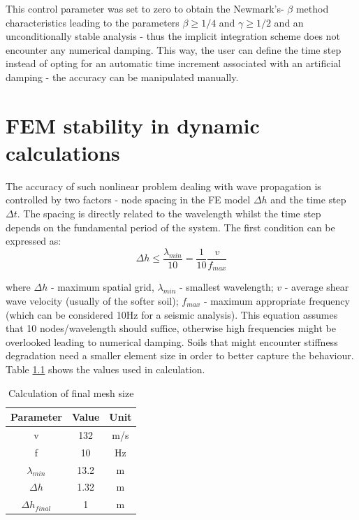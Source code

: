 \documentclass[12pt,a4paper]{report}
\begin{document}
This control parameter was set to zero to obtain the Newmark's- $\beta$ method characteristics leading to the parameters $\beta≥1/4$ and $\gamma ≥1/2$ and an unconditionally stable analysis - thus the implicit integration scheme does not encounter any numerical damping. This way, the user can define the time step instead of opting for an automatic time increment associated with an artificial damping - the accuracy can be manipulated manually.

\newpage
\chapter{FEM stability in dynamic calculations} \label{App:AppendixI}
The accuracy of such nonlinear problem dealing with wave propagation is controlled by two factors - node spacing in the FE model $\Delta h$ and the time step $\Delta t$. The spacing is directly related to the wavelength whilst the time step depends on the fundamental period of the system. 
The first condition can be expressed as:
\begin{equation}
\Delta h\leq\frac{\lambda_{min}}{10}=\frac{1}{10} \frac{v}{f_{max}}
\end{equation}

where $\Delta h$ - maximum spatial grid, $\lambda_{min}$ - smallest wavelength; $v$ - average shear wave velocity (usually of the softer soil); $f_{max}$ - maximum appropriate frequency (which can be considered 10Hz for a seismic analysis). This equation assumes that 10 nodes/wavelength should suffice, otherwise high frequencies might be overlooked leading to numerical damping. Soils that might encounter stiffness degradation need a smaller element size in order to better capture the behaviour. Table \ref{table:Deltah} shows the values used in calculation.

\begin{table}[h!]
	\centering
	\begin{tabular}{|c|c|c|}
		\hline Parameter      &     Value  & Unit  \\
		\hline v      &      132  & m/s  \\
		\hline f & 10 & Hz \\
		\hline $\lambda_{min} $ & 13.2 & m\\
		\hline $\Delta h$ & 1.32 & m \\
		\hline $\Delta h_{final}$ & 1 & m \\
		\hline
	\end{tabular}
	\caption{Calculation of final mesh size}
	\label{table:Deltah}
\end{table}
\end{document}
